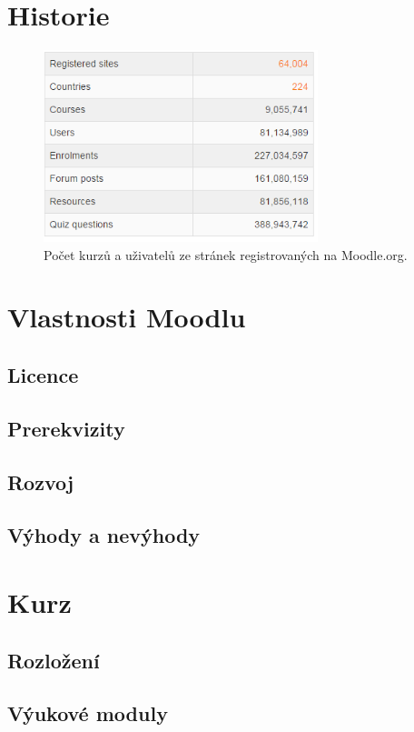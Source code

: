 \documentclass[
print,
  11pt,
  table,   
  nolof,    
  nolot,
  oneside,
  final
]{fithesis3}
\begin{document}
	\section{Historie}
		\begin{figure}
		  \begin{center}
		    \includegraphics[width=80mm]{images/statistiky-moodle.png}
		   \end{center}
		  \caption{Počet kurzů a uživatelů ze stránek registrovaných na Moodle.org.   \cite{moodle-stats}}
		  \label{fig:moodlestats}
		\end{figure}

	\section{Vlastnosti Moodlu}

		\subsection{Licence}
		\subsection{Prerekvizity}
		\subsection{Rozvoj}
		\subsection{Výhody a nevýhody}
	\section{Kurz}
		\subsection{Rozložení}
		\subsection{Výukové moduly}
\end{document}
